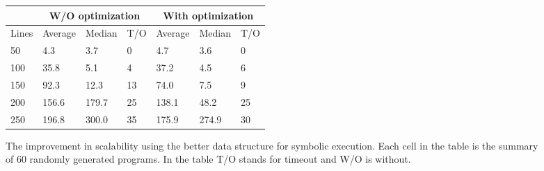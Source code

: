 \documentclass{llncs}
\begin{document}
\begin{figure}[htb]

	\begin{minipage}{0.6\textwidth}
\begin{tabular}{|l|l|l|l|l|l|l|}
	\hline
	& \multicolumn{3}{c|}{\small W/O optimization}	& \multicolumn{3}{c|}{\small With optimization} \\
	\hline
	\small Lines & \small Average & \small Median & \small T/O & \small Average & \small Median & \small T/O \\
	\hline
	\hline
	50	&	4.3	    &   3.7	&	0	&	4.7	&	3.6	&	0	\\
	\hline
	100	&	35.8	&	5.1&	4	&	37.2	&	4.5	&	6	\\
	\hline
	150	&	92.3	&	12.3&	13	&	74.0	&	7.5	&	9	\\
	\hline
	200	&	156.6	&	179.7&	25	&	138.1	&	48.2	&	25	\\
	\hline
	250	&	196.8	&	300.0&	35	&	175.9	&	274.9	&	30	\\
	\hline
\end{tabular}
	\end{minipage}
	\begin{minipage}{0.4\textwidth}
	\end{minipage}


	\caption{The improvement in scalability using the better data structure for symbolic execution. Each cell in the table is the summary of 60 randomly generated programs. In the table T/O stands for timeout and W/O is without. }
	\label{tab:opt2}
\end{figure}
\end{document}
